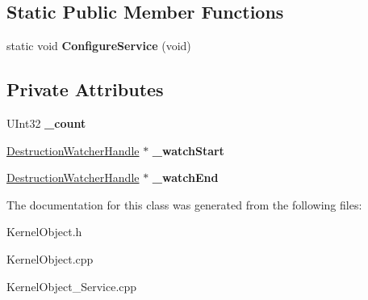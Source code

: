 \subsection*{Static Public Member Functions}
\begin{DoxyCompactItemize}
\item 
\mbox{\label{class_kernel_object_a5fe13e8344acd71e632572c52ea5ddf7}} 
static void {\bfseries Configure\+Service} (void)
\end{DoxyCompactItemize}
\subsection*{Private Attributes}
\begin{DoxyCompactItemize}
\item 
\mbox{\label{class_kernel_object_afb26ceb5200fd39ef9f6b123c6d621fb}} 
U\+Int32 {\bfseries \+\_\+count}
\item 
\mbox{\label{class_kernel_object_abe5916faa507a2a88c75fafc72ddc714}} 
\hyperlink{class_kernel_object_1_1_destruction_watcher_handle}{Destruction\+Watcher\+Handle} $\ast$ {\bfseries \+\_\+watch\+Start}
\item 
\mbox{\label{class_kernel_object_a591fd2f982d0397cdc30b4ccf1c04fb1}} 
\hyperlink{class_kernel_object_1_1_destruction_watcher_handle}{Destruction\+Watcher\+Handle} $\ast$ {\bfseries \+\_\+watch\+End}
\end{DoxyCompactItemize}


The documentation for this class was generated from the following files\+:\begin{DoxyCompactItemize}
\item 
Kernel\+Object.\+h\item 
Kernel\+Object.\+cpp\item 
Kernel\+Object\+\_\+\+Service.\+cpp\end{DoxyCompactItemize}
